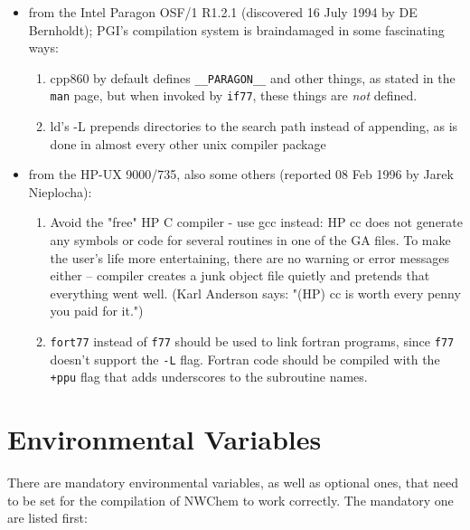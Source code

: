 \begin{itemize}
\item from the Intel Paragon OSF/1 R1.2.1 (discovered 16 July 1994 by DE Bernholdt);
PGI's compilation system is braindamaged in some fascinating ways:
\begin{enumerate}
\item cpp860 by default defines {\tt \_\_PARAGON\_\_} and other things, as stated in
   the {\tt man} page, but when invoked by {\tt if77}, these things are {\em not} defined.
\item ld's -L prepends directories to the search path instead of
   appending, as is done in almost every other unix compiler package
\end{enumerate}

\item from the HP-UX 9000/735, also some others (reported 08 Feb 1996 by Jarek Nieplocha):

\begin{enumerate}
\item Avoid the "free" HP C compiler - use gcc instead:
HP cc does not generate any symbols or code for several routines in one of
the GA files. To make the user's life more entertaining, there are no 
warning or error messages either -- compiler creates a junk object file
quietly and pretends that everything went well.
(Karl Anderson says: "(HP) cc is worth every penny you paid for it.")

\item {\tt fort77} instead of {\tt f77} should be used to link fortran programs, since 
{\tt f77} doesn't support the {\tt -L} flag. Fortran code should be compiled with the 
{\tt +ppu} flag that adds underscores to the subroutine names.
\end{enumerate}

\end{itemize}


\section{Environmental Variables}
\label{sec:envar}

There are mandatory environmental variables, as well as optional ones,
 that need to be set for the compilation of NWChem to work correctly.  
The mandatory one are listed first:

